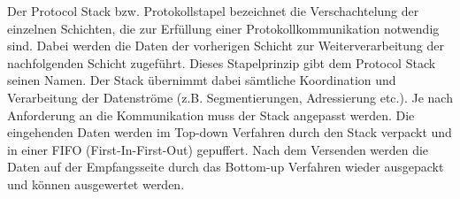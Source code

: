 Der Protocol Stack bzw. Protokollstapel bezeichnet die Verschachtelung der
einzelnen Schichten, die zur Erf{\"u}llung einer Protokollkommunikation
notwendig sind. Dabei werden die Daten der vorherigen Schicht zur
Weiterverarbeitung der nachfolgenden Schicht zugef{\"u}hrt. Dieses Stapelprinzip
gibt dem Protocol Stack seinen Namen. Der Stack {\"u}bernimmt dabei
s{\"a}mtliche Koordination und Verarbeitung der Datenstr{\"o}me (z.B.
Segmentierungen, Adressierung etc.).
Je nach Anforderung an die Kommunikation muss der Stack angepasst werden. Die
eingehenden Daten werden im Top-down Verfahren durch den Stack verpackt
und in einer \gls{FIFO} (First-In-First-Out) gepuffert. Nach dem Versenden werden die
Daten auf der Empfangsseite durch das Bottom-up Verfahren wieder ausgepackt und k{\"o}nnen
ausgewertet werden.
